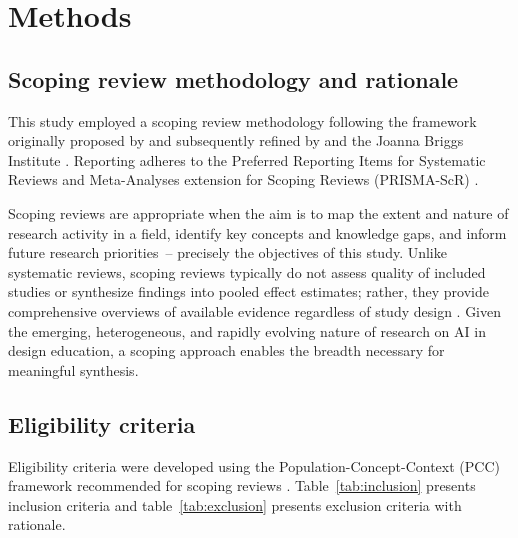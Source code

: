 \documentclass[ed]{acnsart}
\begin{document}

\section{Methods}
\label{sec:methods}

\subsection{Scoping review methodology and rationale}

This study employed a scoping review methodology following the framework originally proposed by \citet{Arksey2005} and subsequently refined by \citet{Levac2010} and the Joanna Briggs Institute \cite{Peters2020}. Reporting adheres to the Preferred Reporting Items for Systematic Reviews and Meta-Analyses extension for Scoping Reviews (PRISMA-ScR) \cite{Tricco2018}.

Scoping reviews are appropriate when the aim is to map the extent and nature of research activity in a field, identify key concepts and knowledge gaps, and inform future research priorities~-- precisely the objectives of this study. Unlike systematic reviews, scoping reviews typically do not assess quality of included studies or synthesize findings into pooled effect estimates; rather, they provide comprehensive overviews of available evidence regardless of study design \cite{Munn2018}. Given the emerging, heterogeneous, and rapidly evolving nature of research on AI in design education, a scoping approach enables the breadth necessary for meaningful synthesis.

\subsection{Eligibility criteria}

Eligibility criteria were developed using the Population-Concept-Context (PCC) framework recommended for scoping reviews \cite{Peters2020}. Table~\ref{tab:inclusion} presents inclusion criteria and table~\ref{tab:exclusion} presents exclusion criteria with rationale.
\end{document}
